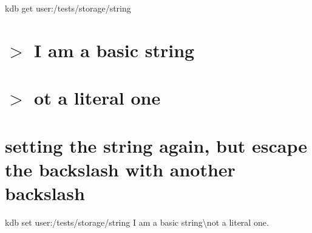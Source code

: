 kdb get \textquotesingle{}user\+:/tests/storage/string\textquotesingle{} \hypertarget{autotoc_md642_autotoc_md692}{}\section{$>$ I am a basic string}\label{autotoc_md642_autotoc_md692}
\hypertarget{autotoc_md642_autotoc_md693}{}\section{$>$ ot a literal one}\label{autotoc_md642_autotoc_md693}
\hypertarget{autotoc_md642_autotoc_md694}{}\section{setting the string again, but escape the backslash with another backslash}\label{autotoc_md642_autotoc_md694}
kdb set \textquotesingle{}user\+:/tests/storage/string\textquotesingle{} \textquotesingle{}I am a basic string\textbackslash{}not a literal one.\textquotesingle{}


